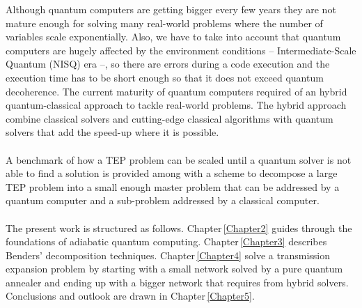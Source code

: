 %
%
Although quantum computers are getting bigger every few years they are not mature enough for solving many real-world problems where the number of variables scale exponentially. Also, we have to take into account that quantum computers are hugely affected by the environment conditions -- Intermediate-Scale Quantum (NISQ) era --, so there are errors during a code execution and the execution time has to be short enough so that it does not exceed quantum decoherence. The current maturity of quantum computers required of an hybrid quantum-classical approach to tackle real-world problems. The hybrid approach combine classical solvers and cutting-edge classical algorithms with quantum solvers that add the speed-up where it is possible.\\\\
A benchmark of how a TEP problem can be scaled until a quantum solver is not able to find a solution is provided among with a scheme to decompose a large TEP problem into a small enough master problem that can be addressed by a quantum computer and a sub-problem addressed by a classical computer. \\\\
%
The present work is structured as follows. Chapter\,\ref{Chapter2} guides through the foundations of adiabatic quantum computing. Chapter\,\ref{Chapter3} describes Benders' decomposition techniques. Chapter\,\ref{Chapter4} solve a transmission expansion problem by starting with a small network solved by a pure quantum annealer and ending up with a bigger network that requires from hybrid solvers. Conclusions and outlook are drawn in Chapter\,\ref{Chapter5}.
